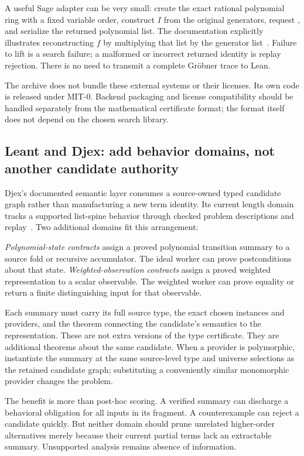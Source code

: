 A useful Sage adapter can be very small: create the exact rational polynomial
ring with a fixed variable order, construct $I$ from the original generators,
request , and serialize the returned polynomial list.
The documentation explicitly illustrates reconstructing $f$ by multiplying
that list by the generator list~\cite{sage-ideals}. Failure to lift is a search
failure; a malformed or incorrect returned identity is replay rejection.
There is no need to transmit a complete Gr\"obner trace to Lean.

The archive does not bundle these external systems or their licenses. Its own
code is released under MIT-0. Backend packaging and license compatibility
should be handled separately from the mathematical certificate format; the
format itself does not depend on the chosen search library.

\subsection{Leant and Djex: add behavior domains, not another candidate authority}

Djex's documented semantic layer consumes a source-owned typed candidate graph
rather than manufacturing a new term identity. Its current length domain
tracks a supported list-spine behavior through checked problem descriptions and
replay~\cite{djex-semantic}. Two additional domains fit this arrangement:

\emph{Polynomial-state contracts} assign a proved polynomial transition summary
to a source fold or recursive accumulator. The ideal worker can prove
postconditions about that state. \emph{Weighted-observation contracts} assign a
proved weighted representation to a scalar observable. The weighted worker can
prove equality or return a finite distinguishing input for that observable.

Each summary must carry its full source type, the exact chosen instances and
providers, and the theorem connecting the candidate's semantics to the
representation. These are not extra versions of the type certificate. They are
additional theorems about the same candidate. When a provider is polymorphic,
instantiate the summary at the same source-level type and universe selections
as the retained candidate graph; substituting a conveniently similar monomorphic
provider changes the problem.

The benefit is more than post-hoc scoring. A verified summary can discharge a
behavioral obligation for all inputs in its fragment. A counterexample can
reject a candidate quickly. But neither domain should prune unrelated
higher-order alternatives merely because their current partial terms lack an
extractable summary. Unsupported analysis remains absence of information.

